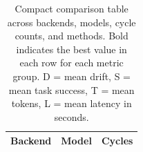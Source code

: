 \begin{table}[t]
\centering
\small
\begin{tabular}{lll}
\toprule
Backend & Model & Cycles \\
\midrule
\bottomrule
\end{tabular}
\caption{Compact comparison table across backends, models, cycle counts, and methods. Bold indicates the best value in each row for each metric group. D = mean drift, S = mean task success, T = mean tokens, L = mean latency in seconds.}
\label{tab:srp-paper-table}
\end{table}
